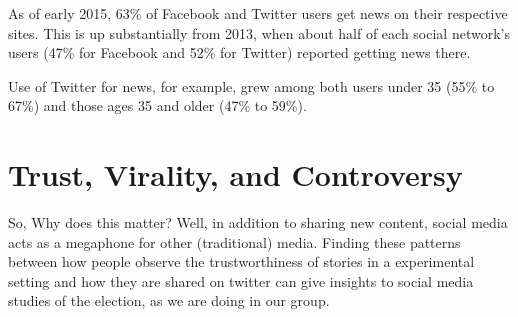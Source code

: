 As of early 2015, 63\% of Facebook and Twitter users get news on their respective sites. This is up substantially from 2013, when about half of each social network’s users (47\% for Facebook and 52\% for Twitter) reported getting news there.

Use of Twitter for news, for example, grew among both users under 35 (55\% to 67\%) and those ages 35 and older (47\% to 59\%). \cite{Pew-news-sharing}


\section{Trust, Virality, and Controversy}

So,
Why does this matter?
Well, in addition to sharing new content, social media acts as a megaphone for other (traditional) media. Finding these patterns between how people observe the trustworthiness of stories in a experimental setting and how they are shared on twitter can give insights to social media studies of the election, as we are doing in our group.


















